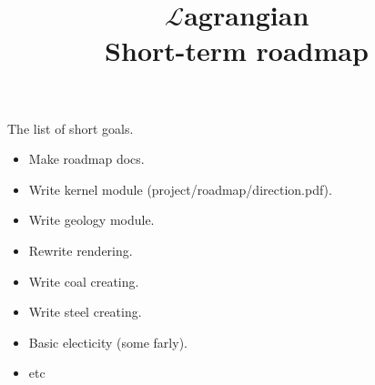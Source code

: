 \documentclass[12pt]{article}
\title{$\mathcal{L}$agrangian \\ Short-term roadmap}
\begin{document}
	\maketitle

	The list of short goals.

    \begin{itemize}
		\item Make roadmap docs.
		\item Write kernel module (project/roadmap/direction.pdf).
		\item Write geology module.
		\item Rewrite rendering.
		\item Write coal creating.
		\item Write steel creating.
		\item Basic electicity (some farly).
		\item etc
	\end{itemize}
\end{document}

